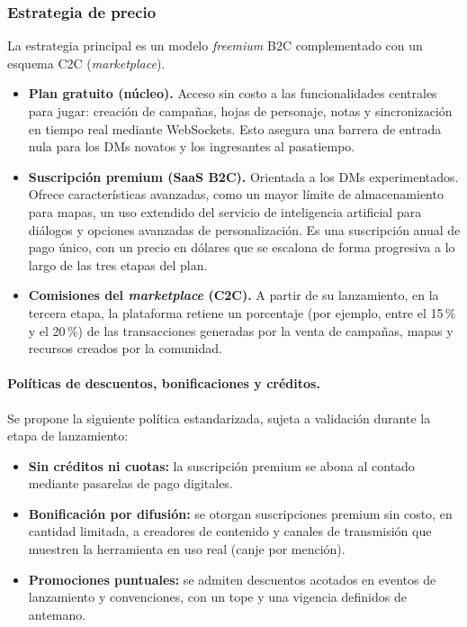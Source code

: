 \subsubsection{Estrategia de precio}
La estrategia principal es un modelo \textit{freemium} B2C complementado con un esquema C2C (\textit{marketplace}).
\begin{itemize}
  \item \textbf{Plan gratuito (núcleo).} Acceso sin costo a las funcionalidades centrales para jugar: creación de campañas, hojas de personaje, notas y sincronización en tiempo real mediante WebSockets. Esto asegura una barrera de entrada nula para los DMs novatos y los ingresantes al pasatiempo.
  \item \textbf{Suscripción premium (SaaS B2C).} Orientada a los DMs experimentados. Ofrece características avanzadas, como un mayor límite de almacenamiento para mapas, un uso extendido del servicio de inteligencia artificial para diálogos y opciones avanzadas de personalización. Es una suscripción anual de pago único, con un precio en dólares que se escalona de forma progresiva a lo largo de las tres etapas del plan.
  \item \textbf{Comisiones del \textit{marketplace} (C2C).} A partir de su lanzamiento, en la tercera etapa, la plataforma retiene un porcentaje (por ejemplo, entre el 15\,\% y el 20\,\%) de las transacciones generadas por la venta de campañas, mapas y recursos creados por la comunidad.
\end{itemize}

\paragraph{Políticas de descuentos, bonificaciones y créditos.}
Se propone la siguiente política estandarizada, sujeta a validación durante la etapa de lanzamiento:
\begin{itemize}
  \item \textbf{Sin créditos ni cuotas:} la suscripción premium se abona al contado mediante pasarelas de pago digitales.
  \item \textbf{Bonificación por difusión:} se otorgan suscripciones premium sin costo, en cantidad limitada, a creadores de contenido y canales de transmisión que muestren la herramienta en uso real (canje por mención).
  \item \textbf{Promociones puntuales:} se admiten descuentos acotados en eventos de lanzamiento y convenciones, con un tope y una vigencia definidos de antemano.
\end{itemize}

